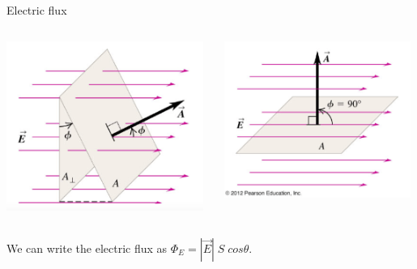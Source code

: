 \begin{frame}{Electric flux}
\begin{columns}
\begin{column}{0.33\textwidth}
\begin{center}
    \includegraphics[width=0.98\textwidth]{./images/schematics/electric_flux_surface_angle.png}\\
   \end{center}
  \end{column}
  \begin{column}{0.33\textwidth}
   \begin{center}
    \includegraphics[width=0.98\textwidth]{./images/schematics/electric_flux_surface_parallel.png}\\
   \end{center}
  \end{column}
\end{columns}

\begin{center}
  We can write the electric flux as $\Phi_E = |\vec{E}| \; S \; cos\theta$.
\end{center}

\end{frame}


